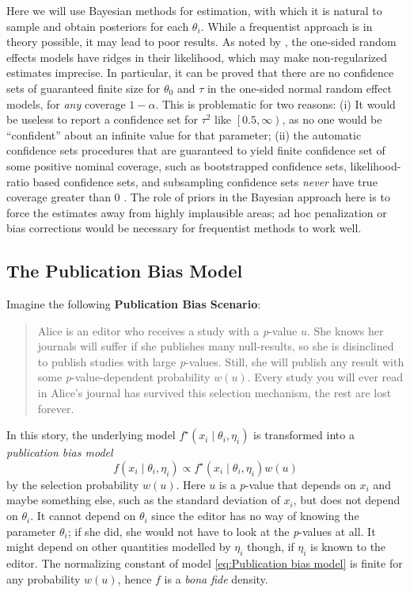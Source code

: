 \documentclass[preprint, authoryear]{elsarticle}
\theoremstyle{plain}
\theoremstyle{definition}
\begin{document}
Here we will use Bayesian methods for estimation, with which it is natural to sample and obtain posteriors for each $\theta_{i}$. While a frequentist approach is in theory possible, it may lead to poor results. As noted by \citet[Appendix, 1]{mcshane2016adjusting}, the one-sided random effects models have ridges in their likelihood, which may make non-regularized estimates imprecise. In particular, it can be proved \citep{Moss2019} that there are no confidence sets of guaranteed finite size for $\theta_{0}$ and $\tau$ in the one-sided normal random effect models, for \emph{any} coverage $1-\alpha$. This is problematic for two reasons: (i) It would be useless to report a confidence set for $\tau^{2}$ like $\left[0.5,\infty\right)$, as no one would be ``confident'' about an infinite value for that parameter; (ii) the automatic confidence sets procedures that are guaranteed to yield finite confidence set of some positive nominal coverage, such as bootstrapped confidence sets, likelihood-ratio based confidence sets, and subsampling confidence sets \emph{never} have true coverage greater than $0$ \citep[see][]{gleser996bootstrap, Moss2019}. The role of priors in the Bayesian approach here is to force the estimates away from highly implausible areas; ad hoc penalization or bias corrections would be necessary for frequentist methods to work well.



\subsection{The Publication Bias Model} \label{subsect:publicationBias}

Imagine the following \textbf{Publication Bias Scenario}:
\begin{quote}
Alice is an editor who receives a study with a \emph{p}-value $u$. She knows her journals will suffer if she publishes many null-results, so she is disinclined to publish studies with large \emph{p}-values. Still, she will publish any result with some \emph{p}-value-dependent probability $w\left(u\right)$. Every study you will ever read in Alice's journal has survived this selection mechanism, the rest are lost forever.
\end{quote}
In this story, the underlying model $f^{\star}\left(x_{i}\mid\theta_{i},\eta_{i}\right)$
is transformed into a \emph{publication bias model}
\begin{equation}
f\left(x_{i}\mid\theta_{i},\eta_{i}\right)\propto f^{\star}\left(x_{i}\mid\theta_{i},\eta_{i}\right)w\left(u\right)\label{eq:Publication bias model}
\end{equation}
by the selection probability $w\left(u\right)$. Here $u$ is a \emph{p}-value that depends on $x_{i}$ and maybe something else, such as the standard deviation of $x_{i}$, but does not depend on $\theta_{i}$. It cannot depend on $\theta_{i}$ since the editor has no way of knowing the parameter $\theta_{i}$; if she did, she would not have to look at the \emph{p}-values at all. It might depend on other quantities modelled by $\eta_{i}$ though, if $\eta_{i}$ is known to the editor. The normalizing constant of model \eqref{eq:Publication bias model} is finite for any probability $w(u)$, hence $f$ is a \emph{bona fide} density.
\end{document}
